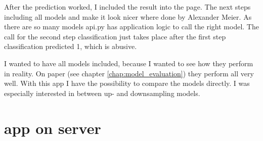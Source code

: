 After the prediction worked, I included the result into the page. The next steps including all models and make it look nicer where done by Alexander Meier. As there are so many models api.py has application logic to call the right model. The call for the second step classification just takes place after the first step classification predicted 1, which is abusive.

I wanted to have all models included, because I wanted to see how they perform in reality. On paper (see chapter \ref{chap:model_evaluation}) they perform all very well. With this app I have the possibility to compare the models directly. I was especially interested in  between up- and downsampling models. 

\section{app on server}
\label{sec:app_on_server} 

